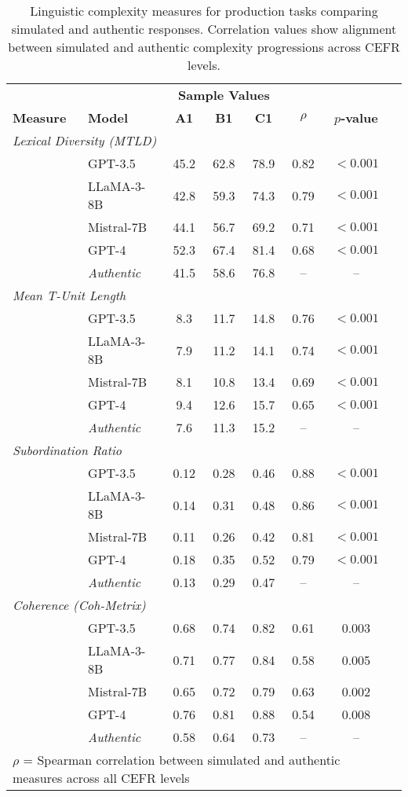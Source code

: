 \begin{table*}[ht]
\centering
\caption{Linguistic complexity measures for production tasks comparing simulated and authentic responses. Correlation values show alignment between simulated and authentic complexity progressions across CEFR levels.}
\label{tab:linguistic_complexity}
\small
\begin{tabular}{llcccccc}
\toprule
& & \multicolumn{3}{c}{\textbf{Sample Values}} & & \\
\cmidrule(lr){3-5}
\textbf{Measure} & \textbf{Model} & \textbf{A1} & \textbf{B1} & \textbf{C1} & \textbf{$\rho$} & \textbf{$p$-value} \\
\midrule
\multicolumn{7}{l}{\textit{Lexical Diversity (MTLD)}} \\
& GPT-3.5 & 45.2 & 62.8 & 78.9 & 0.82 & $< 0.001$ \\
& LLaMA-3-8B & 42.8 & 59.3 & 74.3 & 0.79 & $< 0.001$ \\
& Mistral-7B & 44.1 & 56.7 & 69.2 & 0.71 & $< 0.001$ \\
& GPT-4 & 52.3 & 67.4 & 81.4 & 0.68 & $< 0.001$ \\
& \textit{Authentic} & 41.5 & 58.6 & 76.8 & -- & -- \\
\midrule
\multicolumn{7}{l}{\textit{Mean T-Unit Length}} \\
& GPT-3.5 & 8.3 & 11.7 & 14.8 & 0.76 & $< 0.001$ \\
& LLaMA-3-8B & 7.9 & 11.2 & 14.1 & 0.74 & $< 0.001$ \\
& Mistral-7B & 8.1 & 10.8 & 13.4 & 0.69 & $< 0.001$ \\
& GPT-4 & 9.4 & 12.6 & 15.7 & 0.65 & $< 0.001$ \\
& \textit{Authentic} & 7.6 & 11.3 & 15.2 & -- & -- \\
\midrule
\multicolumn{7}{l}{\textit{Subordination Ratio}} \\
& GPT-3.5 & 0.12 & 0.28 & 0.46 & 0.88 & $< 0.001$ \\
& LLaMA-3-8B & 0.14 & 0.31 & 0.48 & 0.86 & $< 0.001$ \\
& Mistral-7B & 0.11 & 0.26 & 0.42 & 0.81 & $< 0.001$ \\
& GPT-4 & 0.18 & 0.35 & 0.52 & 0.79 & $< 0.001$ \\
& \textit{Authentic} & 0.13 & 0.29 & 0.47 & -- & -- \\
\midrule
\multicolumn{7}{l}{\textit{Coherence (Coh-Metrix)}} \\
& GPT-3.5 & 0.68 & 0.74 & 0.82 & 0.61 & 0.003 \\
& LLaMA-3-8B & 0.71 & 0.77 & 0.84 & 0.58 & 0.005 \\
& Mistral-7B & 0.65 & 0.72 & 0.79 & 0.63 & 0.002 \\
& GPT-4 & 0.76 & 0.81 & 0.88 & 0.54 & 0.008 \\
& \textit{Authentic} & 0.58 & 0.64 & 0.73 & -- & -- \\
\bottomrule
\multicolumn{7}{l}{\footnotesize{$\rho$ = Spearman correlation between simulated and authentic measures across all CEFR levels}} \\
\end{tabular}
\end{table*}
